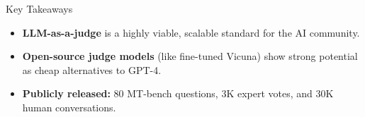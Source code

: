 \documentclass[10pt]{beamer}
\begin{document}
\begin{frame}{Key Takeaways}
  \begin{itemize}
    \item \textbf{LLM-as-a-judge} is a highly viable, scalable standard for the AI community.
    \item \textbf{Open-source judge models} (like fine-tuned Vicuna) show strong potential as cheap alternatives to GPT-4.
    \item \textbf{Publicly released:} 80 MT-bench questions, 3K expert votes, and 30K human conversations.
  \end{itemize}
\end{frame}
\end{document}

